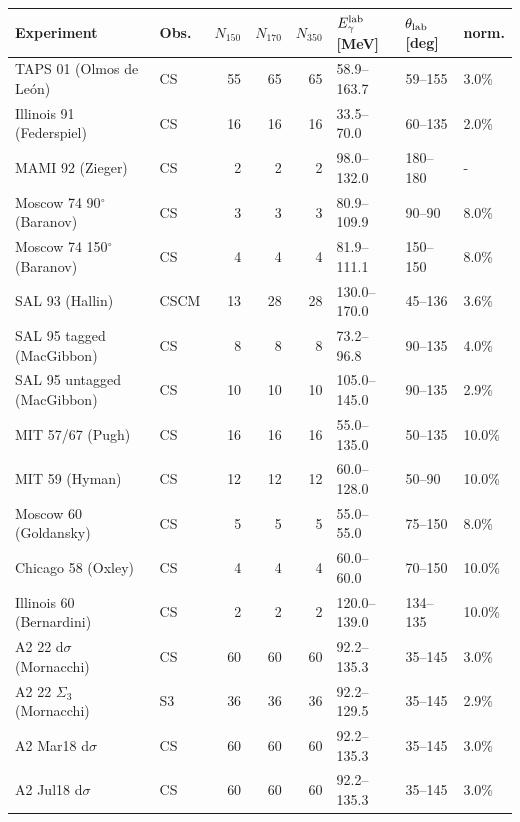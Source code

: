 \begin{tabular}{llrrrlll}
\hline
Experiment & Obs. & $N_{150}$ & $N_{170}$ & $N_{350}$ & $E_\gamma^{\rm lab}$ [MeV] & $\theta_{\rm lab}$ [deg] & norm. \\
\hline
TAPS 01 (Olmos de León)~\cite{deLeon:2001dnx} & CS & 55 & 65 & 65 & 58.9--163.7 & 59--155 & 3.0\% \\
Illinois 91 (Federspiel)~\cite{Federspiel:1991yd} & CS & 16 & 16 & 16 & 33.5--70.0 & 60--135 & 2.0\% \\
MAMI 92 (Zieger)~\cite{Zieger:1992jq} & CS & 2 & 2 & 2 & 98.0--132.0 & 180--180 & - \\
Moscow 74 90$^\circ$ (Baranov)~\cite{Baranov:1974ec,Baranov:1975ju} & CS & 3 & 3 & 3 & 80.9--109.9 & 90--90 & 8.0\% \\
Moscow 74 150$^\circ$ (Baranov)~\cite{Baranov:1974ec,Baranov:1975ju} & CS & 4 & 4 & 4 & 81.9--111.1 & 150--150 & 8.0\% \\
SAL 93 (Hallin)~\cite{Hallin:1993ft} & CSCM & 13 & 28 & 28 & 130.0--170.0 & 45--136 & 3.6\% \\
SAL 95 tagged (MacGibbon)~\cite{MacGibbon:1995in} & CS & 8 & 8 & 8 & 73.2--96.8 & 90--135 & 4.0\% \\
SAL 95 untagged (MacGibbon)~\cite{MacGibbon:1995in} & CS & 10 & 10 & 10 & 105.0--145.0 & 90--135 & 2.9\% \\
MIT 57/67 (Pugh)~\cite{Pugh:1957zz} & CS & 16 & 16 & 16 & 55.0--135.0 & 50--135 & 10.0\% \\
MIT 59 (Hyman)~\cite{Hyman:1959zz} & CS & 12 & 12 & 12 & 60.0--128.0 & 50--90 & 10.0\% \\
Moscow 60 (Goldansky)~\cite{Goldansky:1960} & CS & 5 & 5 & 5 & 55.0--55.0 & 75--150 & 8.0\% \\
Chicago 58 (Oxley)~\cite{Oxley:1958zz} & CS & 4 & 4 & 4 & 60.0--60.0 & 70--150 & 10.0\% \\
Illinois 60 (Bernardini)~\cite{Bernardini:1960wya} & CS & 2 & 2 & 2 & 120.0--139.0 & 134--135 & 10.0\% \\
A2 22 d$\sigma$ (Mornacchi)~\cite{A2:2021wmm} & CS & 60 & 60 & 60 & 92.2--135.3 & 35--145 & 3.0\% \\
A2 22 $\Sigma_{3}$ (Mornacchi)~\cite{A2:2021wmm} & S3 & 36 & 36 & 36 & 92.2--129.5 & 35--145 & 2.9\% \\
A2 Mar18 d$\sigma$~\cite{Mornacchi thesis} & CS & 60 & 60 & 60 & 92.2--135.3 & 35--145 & 3.0\% \\
A2 Jul18 d$\sigma$~\cite{Mornacchi thesis} & CS & 60 & 60 & 60 & 92.2--135.3 & 35--145 & 3.0\% \\

\end{tabular}

